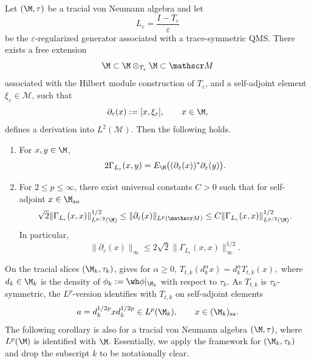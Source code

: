 \documentclass[sn-mathphys-num]{sn-jnl}
\begin{document}
\begin{lemma}\label{lem:diff-quotient-derivation}
Let $(\M,\tau)$ be a tracial von Neumann algebra and let
\[
L_\varepsilon=\frac{I-T_\varepsilon}{\varepsilon}
\]
be the $\varepsilon$-regularized generator associated with a trace-symmetric
QMS. There exists a free extension
\[
\M\subset \M\otimes_{T_\varepsilon}\M \subset \mathscr M
\]
associated with the Hilbert module construction \cite{lance1995hilbert} of $T_\varepsilon$, and a
self-adjoint element $\xi_\varepsilon\in \mathscr M$, such that
\[
\partial_\varepsilon(x):=[x,\xi_\varepsilon],
\qquad x\in\M,
\]
defines a derivation into $L^2(\mathscr M)$.
Then the following holds.

\begin{enumerate}
\item[(i)] For $x,y\in \M$,
\[
2\Gamma_{L_\varepsilon}(x,y)
=
E_{\M}\bigl(
(\partial_\varepsilon(x))^*
\partial_\varepsilon(y)
\bigr).
\]
\item[(ii)] For $2\le p\le \infty$, there exist universal constants
$C>0$ such that for self-adjoint $x\in \M_{sa}$
\[
\sqrt{2}
\|\Gamma_{L_\varepsilon}(x,x)\|_{L^{p/2}(\M)}^{1/2}
\le
\|\partial_\varepsilon(x)\|_{L^p(\mathscr M)}
\le
C
\|\Gamma_{L_\varepsilon}(x,x)\|_{L^{p/2}(\M)}^{1/2}.
\]
In particular,
\begin{equation}\label{eq:infty-estimate}    \|\partial_\varepsilon(x)\|_{\infty}
\le
2\sqrt{2}\|\Gamma_{L_\varepsilon}(x,x)\|_\infty^{1/2}.
\end{equation}
\end{enumerate}
\end{lemma}
On the tracial slices $(\M_k,\tau_k)$,  gives for $\alpha\ge0$, $
  T_{t,k}(d_k^\alpha x)
  =
  d_k^\alpha T_{t,k}(x),$ where $d_k\in \M_k$ is the density of $\phi_k:=\wh\phi|_{\M_k}$ with respect to $\tau_k$. As $T_{t,k}$ is
$\tau_k$-symmetric, the $L^p$-version identifies with $T_{t,k}$ on
self-adjoint elements
\[
  a=d_k^{1/2p}xd_k^{1/2p}\in L^p(\M_k),
  \qquad x\in(\M_k)_{\mathrm{sa}}.
\]
The following corollary is also for a tracial von Neumann algebra
$(\M,\tau)$, where $L^p(\M)$ is identified with $\M$. Essentially,
we apply the framework for $(\M_k,\tau_k)$ and drop the subscript $k$
to be notationally clear.
\end{document}

